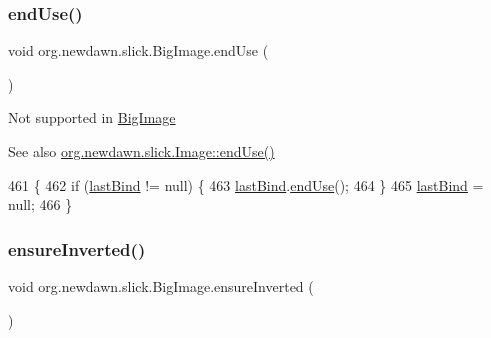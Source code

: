 \subsubsection{\texorpdfstring{end\+Use()}{endUse()}}
{\footnotesize\ttfamily void org.\+newdawn.\+slick.\+Big\+Image.\+end\+Use (\begin{DoxyParamCaption}{ }\end{DoxyParamCaption})\hspace{0.3cm}{\ttfamily [inline]}}

Not supported in \mbox{\hyperlink{classorg_1_1newdawn_1_1slick_1_1_big_image}{Big\+Image}}

\begin{DoxySeeAlso}{See also}
\mbox{\hyperlink{classorg_1_1newdawn_1_1slick_1_1_image_a2506df1ee54d606232317b20c29b6db5}{org.\+newdawn.\+slick.\+Image\+::end\+Use()}} 
\end{DoxySeeAlso}

\begin{DoxyCode}
461                          \{
462         \textcolor{keywordflow}{if} (\mbox{\hyperlink{classorg_1_1newdawn_1_1slick_1_1_big_image_af04b73bd7ffe77e4b86def5a4d1f9152}{lastBind}} != null) \{
463             \mbox{\hyperlink{classorg_1_1newdawn_1_1slick_1_1_big_image_af04b73bd7ffe77e4b86def5a4d1f9152}{lastBind}}.\mbox{\hyperlink{classorg_1_1newdawn_1_1slick_1_1_image_a2506df1ee54d606232317b20c29b6db5}{endUse}}();
464         \}
465         \mbox{\hyperlink{classorg_1_1newdawn_1_1slick_1_1_big_image_af04b73bd7ffe77e4b86def5a4d1f9152}{lastBind}} = null;
466     \}
\end{DoxyCode}
\mbox{\label{classorg_1_1newdawn_1_1slick_1_1_big_image_a9de7323dccd03d0aa1bd1a5cfd22424c}} 
\subsubsection{\texorpdfstring{ensure\+Inverted()}{ensureInverted()}}
{\footnotesize\ttfamily void org.\+newdawn.\+slick.\+Big\+Image.\+ensure\+Inverted (\begin{DoxyParamCaption}{ }\end{DoxyParamCaption})\hspace{0.3cm}{\ttfamily [inline]}}

